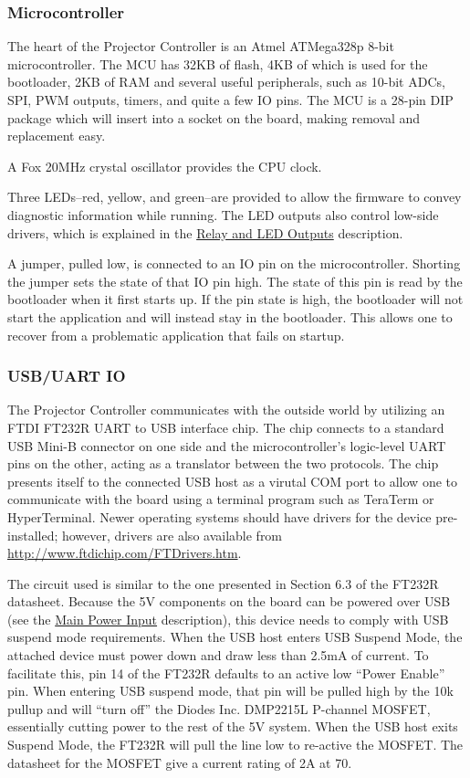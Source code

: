 \documentclass{article}
\begin{document}
\subsubsection{Microcontroller} \label{sssec:Microcontroller}
The heart of the Projector Controller is an Atmel ATMega328p 8-bit microcontroller.  The MCU has
32KB of flash, 4KB of which is used for the bootloader, 2KB of RAM and several useful peripherals,
such as 10-bit ADCs, SPI, PWM outputs, timers, and quite a few IO pins.  The MCU is a 28-pin DIP
package which will insert into a socket on the board, making removal and replacement easy.

A Fox 20MHz crystal oscillator provides the CPU clock.

Three LEDs--red, yellow, and green--are provided to allow the firmware to convey diagnostic
information while running.  The LED outputs also control low-side drivers, which is explained in the
\hyperref[sssec:RelayLED]{Relay and LED Outputs} description.

A jumper, pulled low, is connected to an IO pin on the microcontroller.  Shorting the jumper sets
the state of that IO pin high.  The state of this pin is read by the bootloader when it first starts
up.  If the pin state is high, the bootloader will not start the application and will instead stay
in the bootloader.  This allows one to recover from a problematic application that fails on startup.

\subsubsection{USB/UART IO} \label{sssec:USBUART}
The Projector Controller communicates with the outside world by utilizing an FTDI FT232R UART to
USB interface chip.  The chip connects to a standard USB Mini-B connector on one side and the
microcontroller's logic-level UART pins on the other, acting as a translator between the two
protocols.  The chip presents itself to the connected USB host as a virutal COM port to
allow one to communicate with the board using a terminal program such as TeraTerm or HyperTerminal.
Newer operating systems should have drivers for the device pre-installed; however, drivers are also
available from \url{http://www.ftdichip.com/FTDrivers.htm}.

The circuit used is similar to the one presented in Section 6.3 of the FT232R datasheet.  Because
the 5V components on the board can be powered over USB (see the \hyperref[sssec:MainPower]{Main
  Power Input} description), this device needs to comply with USB suspend mode requirements.  When
the USB host enters USB Suspend Mode, the attached device must power down and draw less than 2.5mA
of current.  To facilitate this, pin 14 of the FT232R defaults to an active low ``Power Enable'' pin.
When entering USB suspend mode, that pin will be pulled high by the 10k\textOmega{} pullup and will
``turn off'' the Diodes Inc. DMP2215L P-channel MOSFET, essentially cutting power to the rest of the
5V system.  When the USB host exits Suspend Mode, the FT232R will pull the line low to re-active the
MOSFET.  The datasheet for the MOSFET give a current rating of 2A at 70\textcelsius{}.
\end{document}
